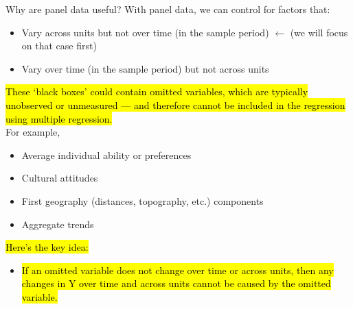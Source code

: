 \documentclass[notes,10pt, aspectratio=169]{beamer}
\begin{document}

\begin{frame}{Why are panel data useful? }
With panel data, we can control for factors that:
\begin{itemize}
    \item Vary across units but not over time (in the sample period) {\footnotesize $\longleftarrow$ (we will focus on that case first)}
    \item Vary over time (in the sample period) but not across units
\end{itemize}
\vspace{1em}
{\hl{These `black boxes' could contain omitted variables, which are typically unobserved or unmeasured --- and therefore cannot be included in the regression using multiple regression.}}\\[1em]

For example,
\begin{itemize}
    \item Average individual ability or preferences
    \item Cultural attitudes
    \item First geography (distances, topography, etc.) components
    \item Aggregate trends
\end{itemize}
\vspace{1em}

{\hl{Here’s the key idea:}}\\
\begin{itemize}
    \item {\hl{If an omitted variable does not change over time or across units, then any changes in Y over time and across units cannot be caused by the omitted variable.}}
\end{itemize}
\end{frame}
\end{document}
